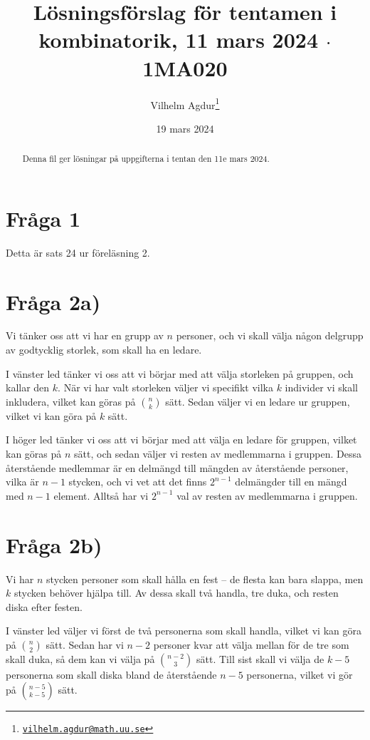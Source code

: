 \documentclass[nobib]{tufte-handout}
\title{Lösningsförslag för tentamen i kombinatorik, 11 mars 2024 $\cdot$ 1MA020}
\author[Vilhelm Agdur]{Vilhelm Agdur\thanks{\href{mailto:vilhelm.agdur@math.uu.se}{\nolinkurl{vilhelm.agdur@math.uu.se}}}}
\date{19 mars 2024}
\begin{document}

\maketitle%

\begin{abstract}
\noindent

Denna fil ger lösningar på uppgifterna i tentan den 11e mars 2024.

\end{abstract}

\section{Fråga 1}

Detta är sats 24 ur föreläsning 2.

\section{Fråga 2a)}

Vi tänker oss att vi har en grupp av $n$ personer, och vi skall välja någon delgrupp av godtycklig storlek, som skall ha en ledare.

I vänster led tänker vi oss att vi börjar med att välja storleken på gruppen, och kallar den $k$. När vi har valt storleken väljer vi specifikt vilka $k$ individer vi skall inkludera, vilket kan göras på ${n \choose k}$ sätt. Sedan väljer vi en ledare ur gruppen, vilket vi kan göra på $k$ sätt.

I höger led tänker vi oss att vi börjar med att välja en ledare för gruppen, vilket kan göras på $n$ sätt, och sedan väljer vi resten av medlemmarna i gruppen. Dessa återstående medlemmar är en delmängd till mängden av återstående personer, vilka är $n-1$ stycken, och vi vet att det finns $2^{n-1}$ delmängder till en mängd med $n-1$ element. Alltså har vi $2^{n-1}$ val av resten av medlemmarna i gruppen.

\section{Fråga 2b)}

Vi har $n$ stycken personer som skall hålla en fest -- de flesta kan bara slappa, men $k$ stycken behöver hjälpa till. Av dessa skall två handla, tre duka, och resten diska efter festen.

I vänster led väljer vi först de två personerna som skall handla, vilket vi kan göra på $n \choose 2$ sätt. Sedan har vi $n-2$ personer kvar att välja mellan för de tre som skall duka, så dem kan vi välja på $n - 2 \choose 3$ sätt. Till sist skall vi välja de $k-5$ personerna som skall diska bland de återstående $n-5$ personerna, vilket vi gör på $n - 5 \choose k - 5$ sätt.
\end{document}
